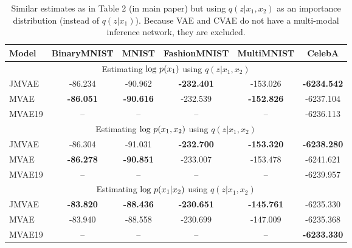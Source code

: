 \begin{table}[h!]
\centering
\small
\begin{tabular}{ l|c|c|c|c|c }
    \toprule
    Model & BinaryMNIST & MNIST & FashionMNIST & MultiMNIST & CelebA \\
    \hline
    \multicolumn{6}{c}{Estimating $\textup{log }p(x_{1})$ using $q(z|x_{1},x_{2})$} \\
    \hline
    JMVAE & -86.234 & -90.962 & \textbf{-232.401} & -153.026 & \textbf{-6234.542} \\
    MVAE & \textbf{-86.051} & \textbf{-90.616} & -232.539 & \textbf{-152.826} & -6237.104 \\
    MVAE19 & -- & -- & -- & -- & -6236.113 \\
    \hline
    \multicolumn{6}{c}{Estimating $\textup{log }p(x_{1},x_{2})$ using $q(z|x_{1},x_{2})$} \\
    \hline
    JMVAE & -86.304 & -91.031 & \textbf{-232.700} & \textbf{-153.320} & \textbf{-6238.280} \\
    MVAE & \textbf{-86.278} & \textbf{-90.851} & -233.007 & -153.478 & -6241.621 \\
    MVAE19 & -- & -- & -- & -- & -6239.957 \\
    \hline
    \multicolumn{6}{c}{Estimating $\textup{log }p(x_{1}|x_{2})$ using $q(z|x_{1},x_{2})$} \\
    \hline
    JMVAE & \textbf{-83.820} & \textbf{-88.436} & \textbf{-230.651} & \textbf{-145.761} & -6235.330 \\
    MVAE & -83.940 & -88.558 & -230.699 & -147.009 & -6235.368 \\
    MVAE19 & -- & -- & -- & -- & \textbf{-6233.330} \\
    \bottomrule
\end{tabular}
\caption{Similar estimates as in Table 2 (in main paper) but using $q(z|x_{1},x_{2})$ as an importance distribution (instead of $q(z|x_{1})$). Because VAE and CVAE do not have a multi-modal inference network, they are excluded.}
\label{table:xy_results}
\end{table}

